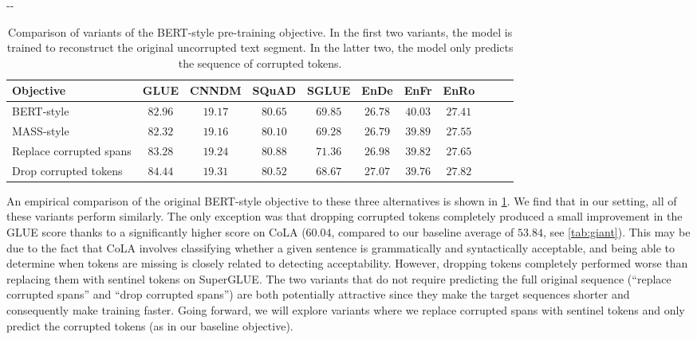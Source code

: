 \documentclass[twoside,11pt]{article}
\newlength{\offsetpage}
\newenvironment{widepage}{\begin{adjustwidth}{-\offsetpage}{-\offsetpage}
    \addtolength{\textwidth}{2\offsetpage}}
{\end{adjustwidth}}
\newcommand{\bsl}{\makebox[0pt][r]{\raisebox{0.05em}{$\bigstar\,$}}}
\def\*#1{\mathbf{#1}}
\begin{document}
\begin{table}
\footnotesize
\begin{widepage}
\centering
\begin{tabular}{l c c c c c c c c c c}
\toprule
    Objective                         & GLUE        & CNNDM       & SQuAD       & SGLUE       & EnDe        & EnFr        & EnRo    \\
\midrule
    BERT-style \citep{devlin2018bert} & $82.96$     & $19.17$     & $\*{80.65}$ & $69.85$     & $26.78$     & $\*{40.03}$ & $27.41$ \\
    MASS-style \citep{song2019mass}   & $82.32$     & $19.16$     & $80.10$     & $69.28$     & $26.79$     & $\*{39.89}$ & $27.55$ \\
    \bsl Replace corrupted spans      & $83.28$     & $\*{19.24}$ & $\*{80.88}$ & $\*{71.36}$ & $\*{26.98}$ & $39.82$     & $\*{27.65}$ \\
    Drop corrupted tokens             & $\*{84.44}$ & $\*{19.31}$ & $\*{80.52}$ & $68.67$     & $\*{27.07}$ & $39.76$     & $\*{27.82}$ \\
\bottomrule
\end{tabular}
\end{widepage}
\caption{
Comparison of variants of the BERT-style pre-training objective.
In the first two variants, the model is trained to reconstruct the original uncorrupted text segment.
In the latter two, the model only predicts the sequence of corrupted tokens.
}
\label{tab:objectives_bert}
\end{table}

An empirical comparison of the original BERT-style objective to these three alternatives is shown in \cref{tab:objectives_bert}.
We find that in our setting, all of these variants perform similarly.
The only exception was that dropping corrupted tokens completely produced a small improvement in the GLUE score thanks to a significantly higher score on CoLA ($60.04$, compared to our baseline average of $53.84$, see \cref{tab:giant}).
This may be due to the fact that CoLA involves classifying whether a given sentence is grammatically and syntactically acceptable, and being able to determine when tokens are missing is closely related to detecting acceptability.
However, dropping tokens completely performed worse than replacing them with sentinel tokens on SuperGLUE.
The two variants that do not require predicting the full original sequence (``replace corrupted spans'' and ``drop corrupted spans'') are both potentially attractive since they make the target sequences shorter and consequently make training faster.
Going forward, we will explore variants where we replace corrupted spans with sentinel tokens and only predict the corrupted tokens (as in our baseline objective).
\end{document}
